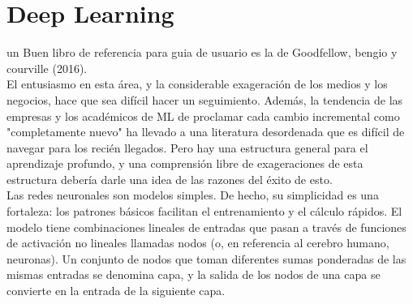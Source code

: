 \section{Deep Learning}
un Buen libro de referencia para guia de usuario es la de Goodfellow, bengio y courville (2016).\\
El entusiasmo en esta área, y la considerable exageración de los medios y los negocios, hace que sea difícil hacer un seguimiento. Además, la tendencia de las empresas y los académicos de ML de proclamar cada cambio incremental como "completamente nuevo" ha llevado a una literatura desordenada que es difícil de navegar para los recién llegados. Pero hay una estructura general para el aprendizaje profundo, y una comprensión libre de exageraciones de esta estructura debería darle una idea de las razones del éxito de esto.\\
Las redes neuronales son modelos simples. De hecho, su simplicidad es una fortaleza: los patrones básicos facilitan el entrenamiento y el cálculo rápidos. El modelo tiene combinaciones lineales de entradas que pasan a través de funciones de activación no lineales llamadas nodos (o, en referencia al cerebro humano, neuronas). Un conjunto de nodos que toman diferentes sumas ponderadas de las mismas entradas se denomina capa, y la salida de los nodos de una capa se convierte en la entrada de la siguiente capa.\\

